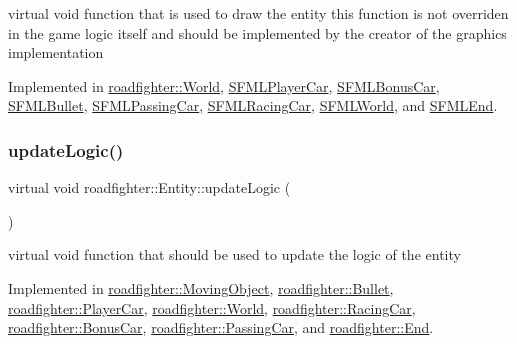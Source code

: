 virtual void function that is used to draw the entity this function is not overriden in the game logic itself and should be implemented by the creator of the graphics implementation 

Implemented in \hyperlink{classroadfighter_1_1World_a90534263a154d6d7c1e8aef4e0138881}{roadfighter\+::\+World}, \hyperlink{classSFMLPlayerCar_ab4adedb2554e5f5eb59b7565a592c2b2}{S\+F\+M\+L\+Player\+Car}, \hyperlink{classSFMLBonusCar_a95d6a17fdbd099db1fe080da1581da20}{S\+F\+M\+L\+Bonus\+Car}, \hyperlink{classSFMLBullet_a2b774898d1f369ab6d1e58659dab389a}{S\+F\+M\+L\+Bullet}, \hyperlink{classSFMLPassingCar_ad860ff5f0eea98fffaa51381c9424e8d}{S\+F\+M\+L\+Passing\+Car}, \hyperlink{classSFMLRacingCar_a2b1c8b9ad2b80c9e18990cb078d2d62d}{S\+F\+M\+L\+Racing\+Car}, \hyperlink{classSFMLWorld_aa0e1deda989ca494937054c5f5b139b0}{S\+F\+M\+L\+World}, and \hyperlink{classSFMLEnd_aee51982a63f9c1c6495f539528683989}{S\+F\+M\+L\+End}.

\mbox{\label{classroadfighter_1_1Entity_a54c00f1af306290bae3e4b84e196566b}} 
\subsubsection{\texorpdfstring{update\+Logic()}{updateLogic()}}
{\footnotesize\ttfamily virtual void roadfighter\+::\+Entity\+::update\+Logic (\begin{DoxyParamCaption}{ }\end{DoxyParamCaption})\hspace{0.3cm}{\ttfamily [pure virtual]}}

virtual void function that should be used to update the logic of the entity 

Implemented in \hyperlink{classroadfighter_1_1MovingObject_a2c5d69054a59fc5c6d7458f864ee9d57}{roadfighter\+::\+Moving\+Object}, \hyperlink{classroadfighter_1_1Bullet_a13aa730279ee8590d0eb2f9e6c01f265}{roadfighter\+::\+Bullet}, \hyperlink{classroadfighter_1_1PlayerCar_a01480487ca7978a50a3c6609f1ebe6df}{roadfighter\+::\+Player\+Car}, \hyperlink{classroadfighter_1_1World_a066592a75c8a38e241013707b429206c}{roadfighter\+::\+World}, \hyperlink{classroadfighter_1_1RacingCar_af3f3b4c368ba61c13dc9b99004895c5d}{roadfighter\+::\+Racing\+Car}, \hyperlink{classroadfighter_1_1BonusCar_a21d55ad1e1595ac6c86ca20f8819778b}{roadfighter\+::\+Bonus\+Car}, \hyperlink{classroadfighter_1_1PassingCar_ac3fe3087290121bf44880f94efa3a916}{roadfighter\+::\+Passing\+Car}, and \hyperlink{classroadfighter_1_1End_aee4a4fed3e7bd5f85f183351280e54f9}{roadfighter\+::\+End}.

